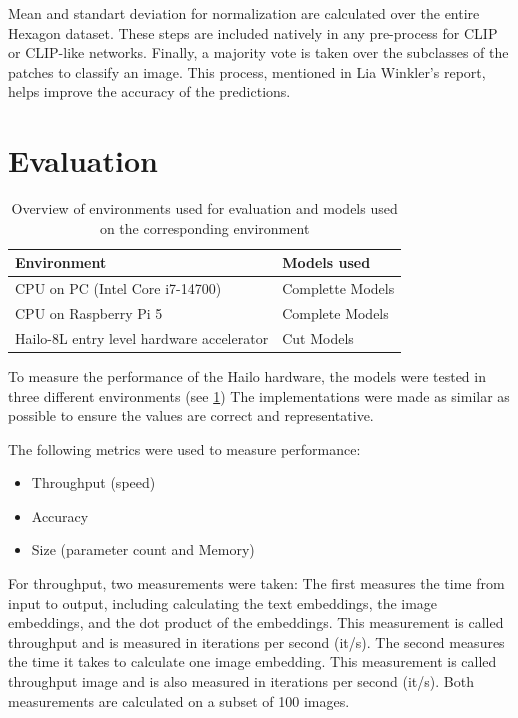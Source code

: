 Mean and standart deviation for normalization are calculated over the entire Hexagon dataset.
These steps are included natively in any pre-process for CLIP or CLIP-like networks.
Finally, a majority vote is taken over the subclasses of the patches to classify an image. 
This process, mentioned in Lia Winkler's report, helps improve the accuracy of the predictions.

\section{Evaluation}
\begin{table}[h!]
    \centering
    \begin{tabular}{l|l}
    \hline
    Environment &  Models used\\
    \hline
    CPU on PC (Intel Core i7-14700) &  Complette Models\\
    CPU on Raspberry Pi 5 &  Complete Models\\
    Hailo-8L entry level hardware accelerator & Cut Models
    \end{tabular}
    \caption{Overview of environments used for evaluation and models used on the corresponding environment}
    \label{tab:implementation:platform}
\end{table}

To measure the performance of the Hailo hardware, the models were tested in three different environments (see \cref{tab:implementation:platform})
The implementations were made as similar as possible to ensure the values are correct and representative. 

The following metrics were used to measure performance:
\begin{itemize}
    \item Throughput (speed)
    \item Accuracy
    \item Size (parameter count and Memory)
\end{itemize}

For throughput, two measurements were taken:
The first measures the time from input to output, including calculating the text embeddings, the image embeddings, and the dot product of the embeddings. This measurement is called throughput and is measured in iterations per second (it/s).
The second measures the time it takes to calculate one image embedding. This measurement is called throughput image and is also measured in iterations per second (it/s).
Both measurements are calculated on a subset of 100 images.

